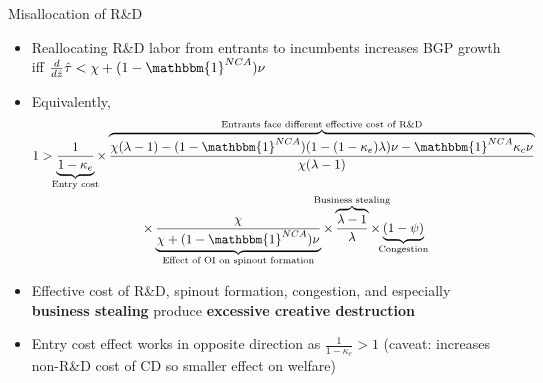 \documentclass[english,usenames,dvipsnames]{beamer}
\begin{document}
\begin{frame}{Misallocation of R\&D}\label{misallocation_of_rd}
	\hyperlink{efficiency}{} 
	\begin{itemize}
		\item <+-> Reallocating R\&D labor from entrants to incumbents increases BGP growth iff $\frac{d}{d\hat{z}} \hat{\tau} < \chi + (1-\mathbbm{1}^{NCA})\nu$
		\item <+-> Equivalently, 
		\footnotesize
		\begin{multline}
		1 >  \underbrace{\frac{1}{1-\kappa_{e}}}_{\mathclap{\text{Entry cost}}} \times \overbrace{\frac{\chi(\lambda-1) -(1-\mathbbm{1}^{NCA}) (1-(1-\kappa_e)\lambda)\nu - \mathbbm{1}^{NCA} \kappa_c \nu}{\chi(\lambda-1)}}^{\mathclap{\text{Entrants face different effective cost of R\&D}}} \\
		\times \underbrace{\frac{\chi}{\chi + (1-\mathbbm{1}^{NCA})\nu}}_{\mathclap{\text{Effect of OI on spinout formation}}} \times \overbrace{\frac{\lambda-1}{\lambda}}^{\mathclap{\text{Business stealing}}} \times  \underbrace{(1-\psi)}_{\mathclap{\text{Congestion}}} \label{eq:RD_reallocation} 
		\end{multline}
		\normalsize
		\item <+-> Effective cost of R\&D, spinout formation, congestion, and especially \alert{\textbf{business stealing}} produce \alert{\textbf{excessive creative destruction}}
		\item <+-> Entry cost effect works in opposite direction as $\frac{1}{1-\kappa_e} > 1$ (caveat: increases non-R\&D cost of CD so smaller effect on welfare)
	\end{itemize}
\end{frame}
\end{document}
